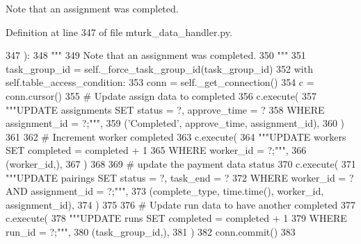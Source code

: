 \begin{DoxyVerb}Note that an assignment was completed.
\end{DoxyVerb}
 

Definition at line 347 of file mturk\+\_\+data\+\_\+handler.\+py.


\begin{DoxyCode}
347     ):
348         \textcolor{stringliteral}{"""}
349 \textcolor{stringliteral}{        Note that an assignment was completed.}
350 \textcolor{stringliteral}{        """}
351         task\_group\_id = self.\_force\_task\_group\_id(task\_group\_id)
352         with self.table\_access\_condition:
353             conn = self.\_get\_connection()
354             c = conn.cursor()
355             \textcolor{comment}{# Update assign data to completed}
356             c.execute(
357                 \textcolor{stringliteral}{"""UPDATE assignments SET status = ?, approve\_time = ?}
358 \textcolor{stringliteral}{                         WHERE assignment\_id = ?;"""},
359                 (\textcolor{stringliteral}{'Completed'}, approve\_time, assignment\_id),
360             )
361 
362             \textcolor{comment}{# Increment worker completed}
363             c.execute(
364                 \textcolor{stringliteral}{"""UPDATE workers SET completed = completed + 1}
365 \textcolor{stringliteral}{                         WHERE worker\_id = ?;"""},
366                 (worker\_id,),
367             )
368 
369             \textcolor{comment}{# update the payment data status}
370             c.execute(
371                 \textcolor{stringliteral}{"""UPDATE pairings SET status = ?, task\_end = ?}
372 \textcolor{stringliteral}{                         WHERE worker\_id = ? AND assignment\_id = ?;"""},
373                 (complete\_type, time.time(), worker\_id, assignment\_id),
374             )
375 
376             \textcolor{comment}{# Update run data to have another completed}
377             c.execute(
378                 \textcolor{stringliteral}{"""UPDATE runs SET completed = completed + 1}
379 \textcolor{stringliteral}{                         WHERE run\_id = ?;"""},
380                 (task\_group\_id,),
381             )
382             conn.commit()
383 
\end{DoxyCode}
\mbox{\label{classparlai_1_1mturk_1_1core_1_1mturk__data__handler_1_1MTurkDataHandler_ac4dc07d7412b426c29678b517daf6094}} 
